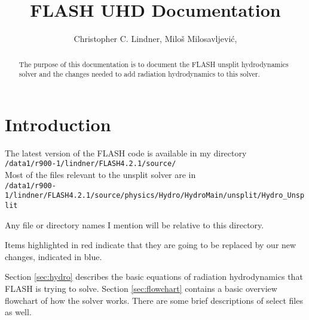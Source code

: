 \documentclass[preprint,11pt]{aastex}
\begin{document}
	

\title{FLASH UHD Documentation}
\author{
Christopher C. Lindner,
Milo\v s Milosavljevi\'c,
}


\begin{abstract}
The purpose of this documentation is to document the FLASH unsplit hydrodynamics solver and the changes needed to add radiation hydrodynamics to this solver.

\keywords{ }


\end{abstract}

\section{Introduction}
\label{sec:intro}
\setcounter{footnote}{0}

The latest version of the FLASH code is available in my directory \\
\verb!/data1/r900-1/lindner/FLASH4.2.1/source/! \\

Most of the files relevant to the unsplit solver are in \\
\verb!/data1/r900-1/lindner/FLASH4.2.1/source/physics/Hydro/HydroMain/unsplit/Hydro_Unsplit!

Any file or directory names I mention will be relative to this directory.

Items highlighted in {\color{red}red} indicate that they are going to be replaced by our new changes, indicated in {\color{blue}blue}.

Section \ref{sec:hydro} describes the basic equations of radiation hydrodynamics that FLASH is trying to solve.  Section \ref{sec:flowchart} contains a basic overview flowchart of how the solver works.  There are some brief descriptions of select files as well.
\end{document}
